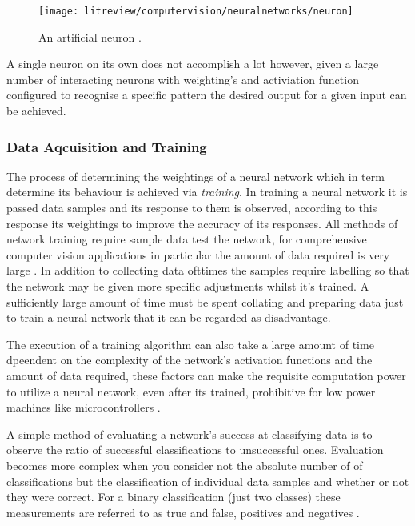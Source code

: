 \begin{figure}[h]
    \centering
    \texttt{[image: litreview/computervision/neuralnetworks/neuron]}
    \caption{An artificial neuron \cite{ann_handbook}.}
    \label{fig:neuron}
\end{figure}

A single neuron on its own does not accomplish a lot however, given a large number of interacting neurons with weighting's and activiation function configured to recognise a specific pattern the desired output for a given input can be achieved.

\subsubsection{Data Aqcuisition and Training}

The process of determining the weightings of a neural network which in term determine its behaviour is achieved via \emph{training}. In training a neural network it is passed data samples and its response to them is observed, according to this response its weightings to improve the accuracy of its responses. All methods of network training require sample data test the network, for comprehensive computer vision applications in particular the amount of data required is very large \cite{large_data_neural_network}. In addition to collecting data ofttimes the samples require labelling so that the network may be given more specific adjustments whilst it's trained. A sufficiently large amount of time must be spent collating and preparing data just to train a neural network \cite{data_labelling} that it can be regarded as disadvantage.

The execution of a training algorithm can also take a large amount of time dpeendent on the complexity of the network's activation functions and the amount of data required, these factors can make the requisite computation power to utilize a neural network, even after its trained, prohibitive for low power machines like microcontrollers \cite{computations_neural_network}. 

A simple method of evaluating a network's success at classifying data is to observe the ratio of successful classifications to unsuccessful ones. Evaluation becomes more complex when you consider not the absolute number of of classifications but the classification of individual data samples and whether or not they were correct. For a binary classification (just two classes) these measurements are referred to as true and false, positives and negatives \cite{neural_networks}. 

